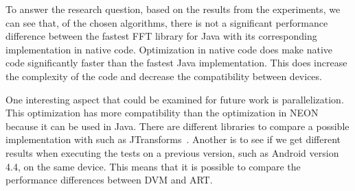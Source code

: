 To answer the research question, based on the results from the experiments, we can see that, of the chosen algorithms, there is not a significant performance difference between the fastest FFT library for Java with its corresponding implementation in native code. Optimization in native code does make native code significantly faster than the fastest Java implementation. This does increase the complexity of the code and decrease the compatibility between devices.

One interesting aspect that could be examined for future work is parallelization. This optimization has more compatibility than the optimization in NEON because it can be used in Java. There are different libraries to compare a possible implementation with such as JTransforms~\cite{jtransforms:benchmark}. Another is to see if we get different results when executing the tests on a previous version, such as Android version 4.4, on the same device. This means that it is possible to compare the performance differences between DVM and ART.
